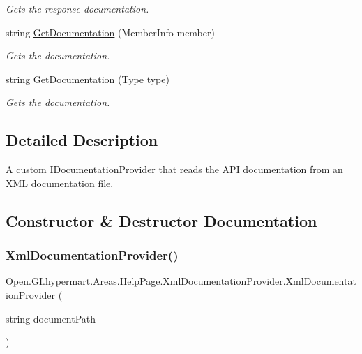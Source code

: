 \begin{DoxyCompactItemize}
\begin{DoxyCompactList}\small\item\em Gets the response documentation. \end{DoxyCompactList}\item 
string \hyperlink{class_open_1_1_g_i_1_1hypermart_1_1_areas_1_1_help_page_1_1_xml_documentation_provider_a1ba7e50dea71787a555f92306ec99efc}{Get\+Documentation} (Member\+Info member)
\begin{DoxyCompactList}\small\item\em Gets the documentation. \end{DoxyCompactList}\item 
string \hyperlink{class_open_1_1_g_i_1_1hypermart_1_1_areas_1_1_help_page_1_1_xml_documentation_provider_af096939cdb4e5a26bd20ae3341fad66c}{Get\+Documentation} (Type type)
\begin{DoxyCompactList}\small\item\em Gets the documentation. \end{DoxyCompactList}\end{DoxyCompactItemize}


\subsection{Detailed Description}
A custom I\+Documentation\+Provider that reads the A\+PI documentation from an X\+ML documentation file. 



\subsection{Constructor \& Destructor Documentation}
\hypertarget{class_open_1_1_g_i_1_1hypermart_1_1_areas_1_1_help_page_1_1_xml_documentation_provider_a20855501bd3ff394652127b70e822308}{}\label{class_open_1_1_g_i_1_1hypermart_1_1_areas_1_1_help_page_1_1_xml_documentation_provider_a20855501bd3ff394652127b70e822308} 
\subsubsection{\texorpdfstring{Xml\+Documentation\+Provider()}{XmlDocumentationProvider()}}
{\footnotesize\ttfamily Open.\+G\+I.\+hypermart.\+Areas.\+Help\+Page.\+Xml\+Documentation\+Provider.\+Xml\+Documentation\+Provider (\begin{DoxyParamCaption}\item[{string}]{document\+Path }\end{DoxyParamCaption})}



